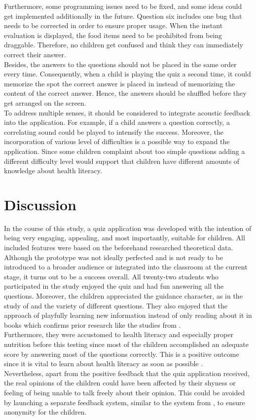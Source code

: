 Furthermore, some programming issues need to be fixed, and some ideas could get implemented additionally in the future. Question six includes one bug that needs to be corrected in order to ensure proper usage. When the instant evaluation is displayed, the food items need to be prohibited from being draggable. Therefore, no children get confused and think they can immediately correct their answer. \\
Besides, the answers to the questions should not be placed in the same order every time. Consequently, when a child is playing the quiz a second time, it could memorize the spot the correct answer is placed in instead of memorizing the content of the correct answer.
Hence, the answers should be shuffled before they get arranged on the screen.\\
To address multiple senses, it should be considered to integrate acoustic feedback into the application. For example, if a child answers a question correctly, a correlating sound could be played to intensify the success.
Moreover, the incorporation of various level of difficulties is a possible way to expand the application. Since some children complaint about too simple questions adding a different difficulty level would support that children have different amounts of knowledge about health literacy.

\section{Discussion}
\label{section:Discussion}
In the course of this study, a quiz application was developed with the intention of being very engaging, appealing, and most importantly, suitable for children. All included features were based on the beforehand researched theoretical data. Although the prototype was not ideally perfected and is not ready to be introduced to a broader audience or integrated into the classroom at the current stage, it turns out to be a success overall. All twenty-two students who participated in the study enjoyed the quiz and had fun answering all the questions. Moreover, the children appreciated the guidance character, as in the study of \textcite{gossen2012search} and the variety of different questions. They also enjoyed that the approach of playfully learning new information instead of only reading about it in books which confirms prior research like the studies from \textcite{gossen2012search, boyd2015evaluating}.\\
Furthermore, they were accustomed to health literacy and especially proper nutrition before this testing since most of the children accomplished an adequate score by answering most of the questions correctly. This is a positive outcome since it is vital to learn about health literacy as soon as possible \autocite{velardo2017emphasizing}. \\
Nevertheless, apart from the positive feedback that the quiz application received, the real opinions of the children could have been affected by their shyness or feeling of being unable to talk freely about their opinion. This could be avoided by launching a separate feedback system, similar to the system from \textcite{alhussayen2015evaluating}, to ensure anonymity for the children. 


